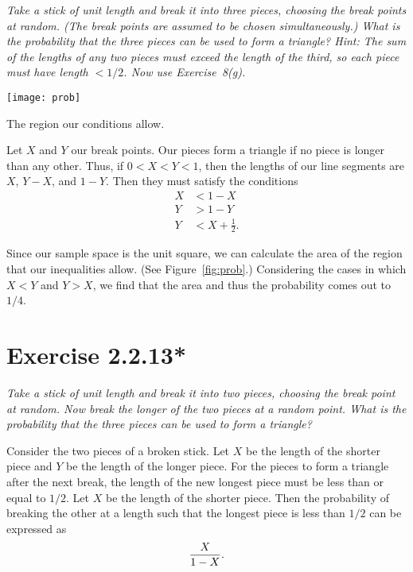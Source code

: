 \documentclass{tufte-handout}
\begin{document}
\emph{Take a stick of unit length and break it into three pieces,
  choosing the break points at random. (The break points are assumed
  to be chosen simultaneously.) What is the probability that the three
  pieces can be used to form a triangle? \emph{Hint}: The sum of the
  lengths of any two pieces must exceed the length of the third, so
  each piece must have length $< 1/2$. Now use Exercise~8(g).}

\bigskip

\begin{marginfigure}
  \texttt{[image: prob]}
  \caption{The region our conditions allow.}
  \label{fig:prob}
\end{marginfigure}

Let $X$ and $Y$ our break points. Our pieces form a triangle if no
piece is longer than any other. Thus, if $0<X<Y<1$, then the lengths
of our line segments are $X$, $Y-X$, and $1-Y$. Then they must satisfy
the conditions
\begin{align*}
  X &< 1 - X \\
  Y &> 1 - Y \\
  Y &< X + \frac{1}{2}.
\end{align*}

Since our sample space is the unit square, we can calculate the area
of the region that our inequalities allow. (See
Figure~\ref{fig:prob}.) Considering the cases in which $X<Y$ and
$Y>X$, we find that the area and thus the probability comes out to
$1/4$.

\section{Exercise 2.2.13*}

\emph{Take a stick of unit length and break it into two pieces,
  choosing the break point at random. Now break the longer of the two
  pieces at a random point. What is the probability that the three
  pieces can be used to form a triangle?}

\bigskip

Consider the two pieces of a broken stick. Let $X$ be the length of
the shorter piece and $Y$ be the length of the longer piece. For the
pieces to form a triangle after the next break, the length of the new
longest piece must be less than or equal to $1/2$. Let $X$ be the
length of the shorter piece. Then the probability of breaking the
other at a length such that the longest piece is less than $1/2$ can
be expressed as%
\[ {X \over 1 - X}. \]
\end{document}
